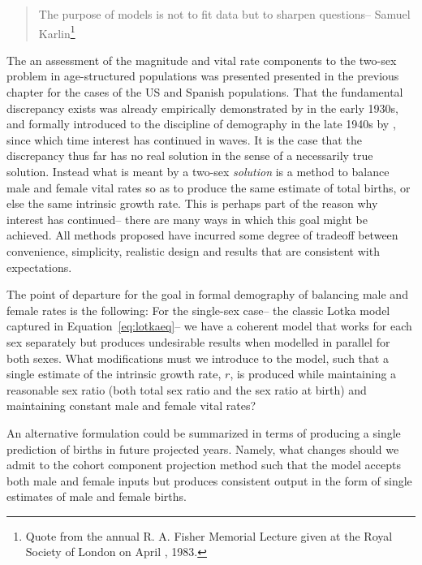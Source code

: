  \FloatBarrier

\begin{singlespace}
\begin{quote}
The purpose of models is not to fit data but to sharpen questions-- Samuel
Karlin\footnote{Quote from the  annual R. A. Fisher Memorial Lecture
given at the Royal Society of London on April , 1983.}
\end{quote}
\end{singlespace}

The an assessment of the magnitude and vital rate components to the two-sex
problem in age-structured populations was presented presented in the previous
chapter for the cases of the US and Spanish populations. That the fundamental
discrepancy exists was already empirically demonstrated by
\citet{kuczynski1932fertility} in the early 1930s, and formally introduced to
the discipline of demography in the late 1940s by \citet{karmel1947relations},
since which time interest has continued in waves. It is the case that the
discrepancy thus far has no real solution in the sense of a necessarily true
solution. Instead what is meant by a two-sex \textit{solution} is a method to
balance male and female vital rates so as to produce the same estimate of
total births, or else the same intrinsic growth rate. This is perhaps part of
the reason why interest has continued-- there are many ways in which this goal
might be achieved. All methods proposed have incurred some degree of tradeoff
between convenience, simplicity, realistic design and results that are
consistent with expectations.
 
The point of departure for the goal in formal demography of balancing male and
female rates is the following: For the single-sex case-- the classic Lotka
model captured in Equation~\eqref{eq:lotkaeq}-- we have a coherent model that
works for each sex separately but produces undesirable results when modelled in parallel for both
sexes. What modifications must we introduce to the model, such that a single
estimate of the intrinsic growth rate, $r$, is produced while maintaining a
reasonable sex ratio (both total sex ratio and the sex ratio at birth) and
maintaining constant male and female vital rates? 

An alternative formulation
could be summarized in terms of producing a single prediction of births in
future projected years. Namely, what changes should we admit to the cohort
component projection method such that the model accepts both male and
female inputs but produces consistent output in the form of single estimates of
male and female births.

